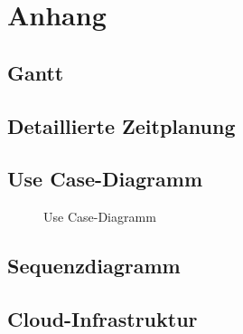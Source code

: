 \section{Anhang}
\label{sec:Anhang}
\subsection{Gantt}
\label{app:Gantt}
\clearpage

\subsection{Detaillierte Zeitplanung}
\label{app:Zeitplanung}
\clearpage

\subsection{Use Case-Diagramm}
\label{app:UseCase}
\begin{figure}[htb]
\centering
% 
\caption{Use Case-Diagramm}
\end{figure}
\clearpage

\subsection{Sequenzdiagramm}
\label{app:Sequenzdiagramm}

\subsection{Cloud-Infrastruktur}
\label{app:Cloud-Infrastruktur}

